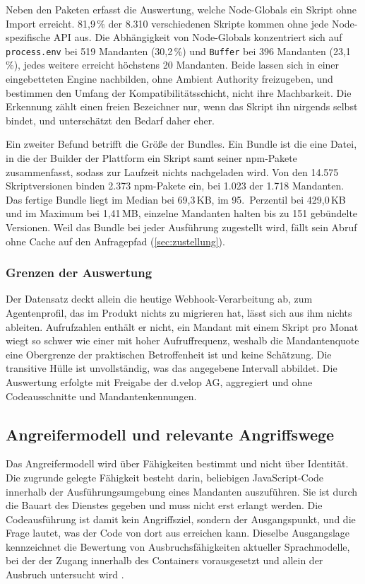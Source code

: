 Neben den Paketen erfasst die Auswertung, welche Node-Globals ein Skript ohne Import erreicht. 81,9\,\% der 8.310
verschiedenen Skripte kommen ohne jede Node-spezifische \ac{API} aus. Die Abhängigkeit von Node-Globals konzentriert
sich auf \texttt{process.env} bei 519 Mandanten (30,2\,\%) und \texttt{Buffer} bei 396 Mandanten (23,1\,\%), jedes
weitere erreicht höchstens 20 Mandanten. Beide lassen sich in einer eingebetteten Engine nachbilden, ohne Ambient
Authority freizugeben, und bestimmen den Umfang der Kompatibilitätsschicht, nicht ihre Machbarkeit. Die Erkennung zählt
einen freien Bezeichner nur, wenn das Skript ihn nirgends selbst bindet, und unterschätzt den Bedarf daher eher.

Ein zweiter Befund betrifft die Größe der Bundles. Ein Bundle ist die eine Datei, in die der Builder der
Plattform ein Skript samt seiner npm-Pakete zusammenfasst, sodass zur Laufzeit nichts nachgeladen wird. Von den 14.575
Skriptversionen binden 2.373 npm-Pakete ein, bei 1.023 der 1.718 Mandanten. Das fertige Bundle liegt im Median bei
69,3\,KB, im 95.\ Perzentil bei 429,0\,KB und im Maximum bei 1,41\,MB, einzelne Mandanten halten bis zu 151
gebündelte Versionen. Weil das Bundle bei jeder Ausführung zugestellt wird, fällt sein Abruf ohne Cache auf den
Anfragepfad (\autoref{sec:zustellung}).

\subsubsection{Grenzen der Auswertung}

Der Datensatz deckt allein die heutige Webhook-Verarbeitung ab, zum Agentenprofil, das im Produkt nichts zu migrieren
hat, lässt sich aus ihm nichts ableiten. Aufrufzahlen enthält er nicht, ein Mandant mit einem Skript pro Monat wiegt so
schwer wie einer mit hoher Aufruffrequenz, weshalb die Mandantenquote eine Obergrenze der praktischen Betroffenheit
ist und keine Schätzung. Die transitive Hülle ist unvollständig, was das angegebene Intervall abbildet. Die Auswertung
erfolgte mit Freigabe der d.velop AG, aggregiert und ohne Codeausschnitte und Mandantenkennungen.

\subsection{Angreifermodell und relevante Angriffswege}
\label{sec:angreifermodell}

Das Angreifermodell wird über Fähigkeiten bestimmt und nicht über Identität. Die zugrunde gelegte
Fähigkeit besteht darin, beliebigen JavaScript-Code innerhalb der Ausführungsumgebung eines
Mandanten auszuführen. Sie ist durch die Bauart des Dienstes gegeben und muss nicht erst erlangt
werden. Die Codeausführung ist damit kein Angriffsziel, sondern der Ausgangspunkt, und die
Frage lautet, was der Code von dort aus erreichen kann. Dieselbe Ausgangslage
kennzeichnet die Bewertung von Ausbruchsfähigkeiten aktueller Sprachmodelle, bei der der Zugang
innerhalb des Containers vorausgesetzt und allein der Ausbruch untersucht wird
\autocite[S.~3]{marchand_quantifying_2026}.

